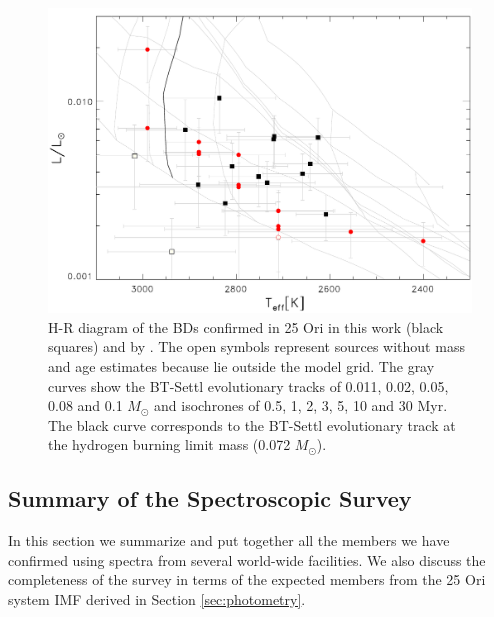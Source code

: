 \documentclass[12pt]{article}
\begin{document}
\begin{figure}[ht!]
	\includegraphics[width=1.0\textwidth]{HR_OSIRIS.pdf}
	\caption[H-R diagram of the so far confirmed members with OSIRIS spectra.]{H-R diagram of the BDs confirmed in 25 Ori in this work (black squares) and by \citet[red circles; ][]{Downes2015}. The open symbols represent sources without mass and age estimates because lie outside the model grid. The gray curves show the BT-Settl evolutionary tracks of 0.011, 0.02, 0.05, 0.08 and 0.1 $M_\odot$ and isochrones of 0.5, 1, 2, 3, 5, 10 and 30 Myr. The black curve corresponds to the BT-Settl evolutionary track at the hydrogen burning limit mass (0.072 $M_\odot$).}
	\label{fig_OSIRIS:HR}
\end{figure}

\subsection{Summary of the Spectroscopic Survey}
\label{sec:spectra}
In this section we summarize and put together all the members we have confirmed using spectra from several world-wide facilities. We also discuss the completeness of the survey in terms of the expected members from the 25 Ori system IMF derived in Section \ref{sec:photometry}.
\end{document}
